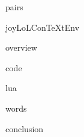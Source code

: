 
\usemodule[t-diSimp]

\startDiSimpComponent pairs

\diSimpEnvironment joyLoLConTeXtEnv

\startJoyLoLCoAlg[title=Pairs][pairs]

\diSimpComponent overview

\diSimpComponent code

\diSimpComponent lua

\diSimpComponent words

\diSimpComponent conclusion

\stopJoyLoLCoAlg

\stopDiSimpComponent
